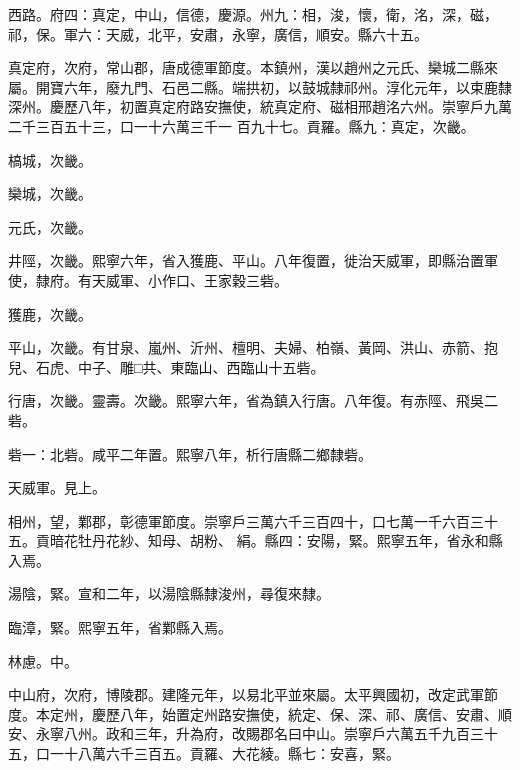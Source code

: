 \begin{pinyinscope}
 西路。府四：真定，中山，信德，慶源。州九：相，浚，懷，衛，洺，深，磁，祁，保。軍六：天威，北平，安肅，永寧，廣信，順安。縣六十五。



 真定府，次府，常山郡，唐成德軍節度。本鎮州，漢以趙州之元氏、欒城二縣來屬。開寶六年，廢九門、石邑二縣。端拱初，以鼓城隸祁州。淳化元年，以束鹿隸深州。慶歷八年，初置真定府路安撫使，統真定府、磁相邢趙洺六州。崇寧戶九萬二千三百五十三，口一十六萬三千一
 百九十七。貢羅。縣九：真定，次畿。



 槁城，次畿。



 欒城，次畿。



 元氏，次畿。



 井陘，次畿。熙寧六年，省入獲鹿、平山。八年復置，徙治天威軍，即縣治置軍使，隸府。有天威軍、小作口、王家穀三砦。



 獲鹿，次畿。



 平山，次畿。有甘泉、嵐州、沂州、檀明、夫婦、柏嶺、黃岡、洪山、赤箭、抱兒、石虎、中子、雕□共、東臨山、西臨山十五砦。



 行唐，次畿。靈壽。次畿。熙寧六年，省為鎮入行唐。八年復。有赤陘、飛吳二砦。



 砦一：北砦。咸平二年置。熙寧八年，析行唐縣二鄉隸砦。



 天威軍。見上。



 相州，望，鄴郡，彰德軍節度。崇寧戶三萬六千三百四十，口七萬一千六百三十五。貢暗花牡丹花紗、知母、胡粉、
 絹。縣四：安陽，緊。熙寧五年，省永和縣入焉。



 湯陰，緊。宣和二年，以湯陰縣隸浚州，尋復來隸。



 臨漳，緊。熙寧五年，省鄴縣入焉。



 林慮。中。



 中山府，次府，博陵郡。建隆元年，以易北平並來屬。太平興國初，改定武軍節度。本定州，慶歷八年，始置定州路安撫使，統定、保、深、祁、廣信、安肅、順安、永寧八州。政和三年，升為府，改賜郡名曰中山。崇寧戶六萬五千九百三十五，口一十八萬六千三百五。貢羅、大花綾。縣七：安喜，緊。




\end{pinyinscope}

